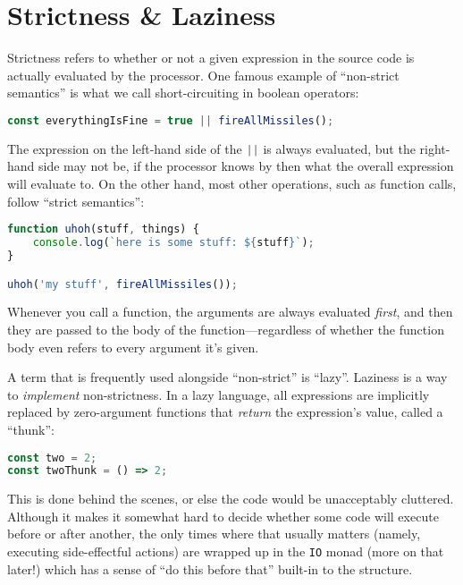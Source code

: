 \documentclass{book}
\newcommand{\mlil}[1]{\lstinline[language=pseudoml,columns=fixed]|#1|}\usepackage{caption}
\begin{document}
\section{Strictness \& Laziness}

Strictness refers to whether or not a given expression in the source code is actually evaluated by the processor. One famous example of ``non-strict semantics'' is what we call short-circuiting in boolean operators:

\begin{lstlisting}[language=js]
const everythingIsFine = true || fireAllMissiles();
\end{lstlisting}

The expression on the left-hand side of the \lstinline[language=js]!||! is always evaluated, but the right-hand side may not be, if the processor knows by then what the overall expression will evaluate to. On the other hand, most other operations, such as function calls, follow ``strict semantics'':

\begin{lstlisting}[language=js]
function uhoh(stuff, things) {
    console.log(`here is some stuff: ${stuff}`);
}

uhoh('my stuff', fireAllMissiles());
\end{lstlisting}

Whenever you call a function, the arguments are always evaluated \emph{first}, and then they are passed to the body of the function---regardless of whether the function body even refers to every argument it's given.

A term that is frequently used alongside ``non-strict'' is ``lazy''. Laziness is a way to \emph{implement} non-strictness. In a lazy language, all expressions are implicitly replaced by zero-argument functions that \emph{return} the expression's value, called a ``thunk'':

\begin{lstlisting}[language=js]
const two = 2;
const twoThunk = () => 2;
\end{lstlisting}

This is done behind the scenes, or else the code would be unacceptably cluttered. Although it makes it somewhat hard to decide whether some code will execute before or after another, the only times where that usually matters (namely, executing side-effectful actions) are wrapped up in the \mlil{IO} monad (more on that later!) which has a sense of ``do this before that'' built-in to the structure.
\end{document}
